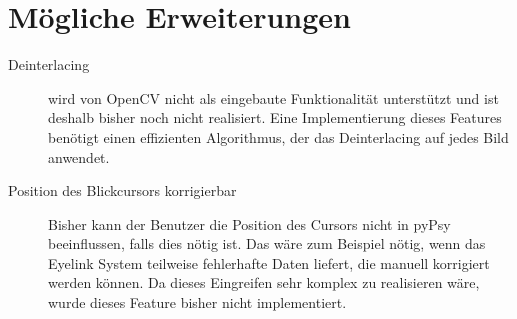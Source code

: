 \documentclass[a4paper,draft]{scrartcl}
\begin{document}
\section{M\"ogliche Erweiterungen}
  \begin{description}
    \item[Deinterlacing] wird von OpenCV nicht als eingebaute Funktionalität unterstützt und ist deshalb bisher noch nicht realisiert. Eine Implementierung dieses Features benötigt einen effizienten Algorithmus, der das Deinterlacing auf jedes Bild anwendet. 
    \item[Position des Blickcursors korrigierbar] Bisher kann der Benutzer die Position des Cursors nicht in pyPsy beeinflussen, falls dies nötig ist. Das wäre zum Beispiel nötig, wenn das Eyelink System teilweise fehlerhafte Daten liefert, die manuell korrigiert werden können. Da dieses Eingreifen sehr komplex zu realisieren wäre, wurde dieses Feature bisher nicht implementiert.
  \end{description}
\end{document}
